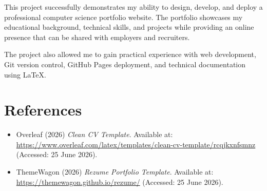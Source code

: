 \documentclass[12pt,a4paper]{article}
\begin{document}
This project successfully demonstrates my ability to design, develop, and 
deploy a professional computer science portfolio website. The portfolio 
showcases my educational background, technical skills, and projects while 
providing an online presence that can be shared with employers and 
recruiters.

The project also allowed me to gain practical experience with web 
development, Git version control, GitHub Pages deployment, and technical 
documentation using LaTeX.



\section{References}

\begin{itemize}

\item Overleaf (2026) \textit{Clean CV Template}. Available at:
\url{https://www.overleaf.com/latex/templates/clean-cv-template/rcqjkxnfsmnz}
(Accessed: 25 June 2026).

\item ThemeWagon (2026) \textit{Rezume Portfolio Template}. Available at:
\url{https://themewagon.github.io/rezume/}
(Accessed: 25 June 2026).

\end{itemize}
\end{document}
